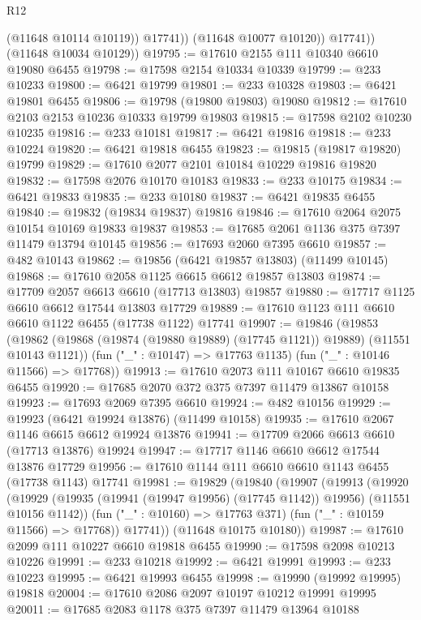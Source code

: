 \begin{lexlean}{R12}
\begin{coremodule}
{{{{{{{{{{{{{{{{{{{{{{{{{{{{{{{{{{{{{{{{{{{{{{{{{{{{{{{{{{{{{{{{{{{{{{{{{{{{{{{{{{                  (@11648 @10114 @10119))
                @17741))
            (@11648 @10077 @10120))
          @17741))
      (@11648 @10034 @10129))
@19795 := @17610 @2155 @111 @10340 @6610 @19080 @6455
@19798 := @17598 @2154 @10334 @10339
@19799 := @233 @10233
@19800 := @6421 @19799
@19801 := @233 @10328
@19803 := @6421 @19801 @6455
@19806 := @19798 (@19800 @19803) @19080
@19812 := @17610 @2103 @2153 @10236 @10333 @19799 @19803
@19815 := @17598 @2102 @10230 @10235
@19816 := @233 @10181
@19817 := @6421 @19816
@19818 := @233 @10224
@19820 := @6421 @19818 @6455
@19823 := @19815 (@19817 @19820) @19799
@19829 := @17610 @2077 @2101 @10184 @10229 @19816 @19820
@19832 := @17598 @2076 @10170 @10183
@19833 := @233 @10175
@19834 := @6421 @19833
@19835 := @233 @10180
@19837 := @6421 @19835 @6455
@19840 := @19832 (@19834 @19837) @19816
@19846 := @17610 @2064 @2075 @10154 @10169 @19833 @19837
@19853 := @17685 @2061 @1136 @375 @7397 @11479 @13794 @10145
@19856 := @17693 @2060 @7395 @6610
@19857 := @482 @10143
@19862 := @19856 (@6421 @19857 @13803) (@11499 @10145)
@19868 := @17610 @2058 @1125 @6615 @6612 @19857 @13803
@19874 := @17709 @2057 @6613 @6610 (@17713 @13803) @19857
@19880 := @17717 @1125 @6610 @6612 @17544 @13803 @17729
@19889 := @17610 @1123 @111 @6610 @6610 @1122 @6455 (@17738 @1122) @17741
@19907 := @19846
    (@19853
      (@19862 (@19868 (@19874 (@19880 @19889) (@17745 @1121)) @19889) (@11551 @10143 @1121))
      (fun ("_" : @10147) => @17763 @1135)
      (fun ("_" : @10146 @11566) => @17768))
@19913 := @17610 @2073 @111 @10167 @6610 @19835 @6455
@19920 := @17685 @2070 @372 @375 @7397 @11479 @13867 @10158
@19923 := @17693 @2069 @7395 @6610
@19924 := @482 @10156
@19929 := @19923 (@6421 @19924 @13876) (@11499 @10158)
@19935 := @17610 @2067 @1146 @6615 @6612 @19924 @13876
@19941 := @17709 @2066 @6613 @6610 (@17713 @13876) @19924
@19947 := @17717 @1146 @6610 @6612 @17544 @13876 @17729
@19956 := @17610 @1144 @111 @6610 @6610 @1143 @6455 (@17738 @1143) @17741
@19981 := @19829
    (@19840
      (@19907
        (@19913
          (@19920
            (@19929 (@19935 (@19941 (@19947 @19956) (@17745 @1142)) @19956) (@11551 @10156 @1142))
            (fun ("_" : @10160) => @17763 @371)
            (fun ("_" : @10159 @11566) => @17768))
          @17741))
      (@11648 @10175 @10180))
@19987 := @17610 @2099 @111 @10227 @6610 @19818 @6455
@19990 := @17598 @2098 @10213 @10226
@19991 := @233 @10218
@19992 := @6421 @19991
@19993 := @233 @10223
@19995 := @6421 @19993 @6455
@19998 := @19990 (@19992 @19995) @19818
@20004 := @17610 @2086 @2097 @10197 @10212 @19991 @19995
@20011 := @17685 @2083 @1178 @375 @7397 @11479 @13964 @10188
}}}}}}}}}}}}}}}}}}}}}}}}}}}}}}}}}}}}}}}}}}}}}}}}}}}}}}}}}}}}}}}}}}}}}}}}}}}}}}}}}}
\end{coremodule}
\end{lexlean}

